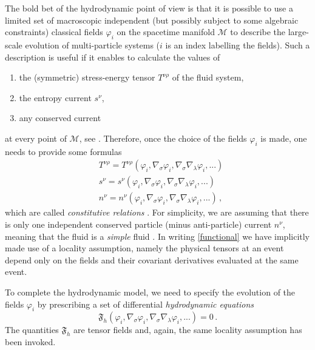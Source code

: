 \documentclass[a4paper, amsfonts, amssymb, amsmath, reprint, twocolumn, showkeys, nofootinbib]{revtex4-2}
\begin{document}
The bold bet of the hydrodynamic point of view is that it is possible to use a limited set of macroscopic independent (but possibly subject to some algebraic constraints) classical fields $\varphi_i$  on the spacetime manifold $\mathcal{M}$ to describe the large-scale evolution of multi-particle systems ($i$ is an index labelling the fields). 
Such a description is useful if it enables to calculate the values of 
\begin{enumerate}
\item the (symmetric) stress-energy tensor $T^{\nu \rho}$ of the fluid system,
\item the entropy current $s^\nu$,
\item any conserved current
\end{enumerate}  
at every point of $\mathcal{M}$, see  \citep{Israel_2009_inbook}. 
Therefore, once the choice of the fields $\varphi_i$ is made, one needs to provide some formulas 
\begin{equation}
\label{functional}
\begin{split}
& T^{\nu \rho} = T^{\nu \rho}(\varphi_i,\nabla_\sigma \varphi_i, \nabla_\sigma \nabla_\lambda \varphi_i,...) \\
& s^\nu = s^\nu (\varphi_i,\nabla_\sigma \varphi_i, \nabla_\sigma \nabla_\lambda \varphi_i,...) \\
& n^\nu = n^\nu (\varphi_i,\nabla_\sigma \varphi_i, \nabla_\sigma \nabla_\lambda \varphi_i,...) \, , 
\end{split}
\end{equation}
which are called \textit{constitutive relations} \citep{Liu1986,Kovtun2019,kovtun_lectures_2012}. 
For simplicity, we are assuming that there is only one independent conserved particle (minus anti-particle) current $n^\nu$, meaning that the fluid is a \textit{simple} fluid \citep{MTW_book}. In writing \eqref{functional} we have implicitly made use of a locality assumption, namely the physical tensors at an event depend only on the fields and their covariant derivatives evaluated at the same event. 

To complete the hydrodynamic model, we need to specify the evolution of the fields $\varphi_i$ by prescribing a set of differential \textit{hydrodynamic equations}
\begin{equation}
\label{hydrouzZZ}
\mathfrak{F}_h(\varphi_i,\nabla_\sigma \varphi_i, \nabla_\sigma \nabla_\lambda \varphi_i,...)=0 \, . 
\end{equation} 
The quantities $\mathfrak{F}_h$ are tensor fields and, again, the same locality assumption has been invoked.
 
\end{document}
